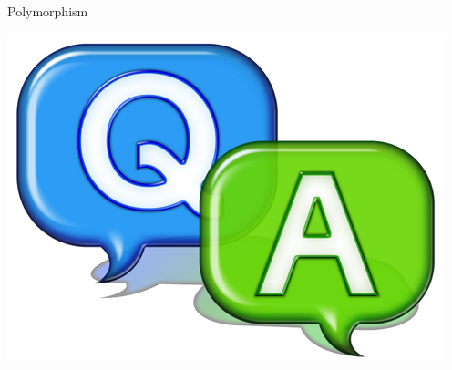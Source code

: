 \documentclass[14pt]{beamer}
\begin{document}
\begin{frame}{Polymorphism}
\begin{center}
    \includegraphics[scale=0.5]{qa.png}
  \end{center}
\end{frame}
\end{document}
